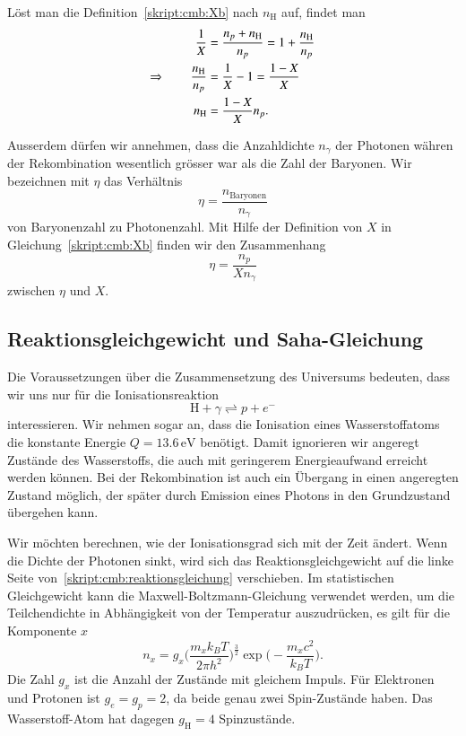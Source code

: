 Löst man die Definition~\eqref{skript:cmb:Xb} nach $n_\text{H}$ auf,
findet man
\begin{align}
\frac1X
&=
\frac{n_p+n_\text{H}}{n_p}
=
1+
\frac{n_\text{H}}{n_p}
\notag
\\
\Rightarrow
\qquad
\frac{n_\text{H}}{n_p}
&=
\frac{1}{X}-1
=
\frac{1-X}{X}
\notag
\\
n_\text{H}
&=
\frac{1-X}{X}n_p.
\label{skript:cmb:XnH}
\end{align}

Ausserdem dürfen wir annehmen, dass die Anzahldichte $n_\gamma$
der Photonen währen der Rekombination wesentlich grösser war als
die Zahl der Baryonen.
Wir bezeichnen mit $\eta$ das Verhältnis
\[
\eta = \frac{n_\text{Baryonen}}{n_\gamma}
\]
von Baryonenzahl zu Photonenzahl.
Mit Hilfe der Definition von $X$ in Gleichung~\eqref{skript:cmb:Xb}
finden wir den Zusammenhang
\begin{equation}
\eta = \frac{n_p}{Xn_\gamma}
\label{skript:cmb:etaX}
\end{equation}
zwischen $\eta$ und $X$.

\subsection{Reaktionsgleichgewicht und Saha-Gleichung}
Die Voraussetzungen über die Zusammensetzung des Universums bedeuten,
dass wir uns nur für die Ionisationsreaktion
\begin{equation}
\text{H} + \gamma 
\rightleftharpoons
p + e^-
\label{skript:cmb:reaktionsgleichung}
\end{equation}
interessieren.
Wir nehmen sogar an, dass die Ionisation eines Wasserstoffatoms 
die konstante Energie $Q=13.6\,\text{eV}$ benötigt.
Damit ignorieren wir angeregt Zustände des Wasserstoffs, die auch
mit geringerem Energieaufwand erreicht werden können.
Bei der Rekombination ist auch ein Übergang in einen angeregten
Zustand möglich, der später durch Emission eines Photons in den Grundzustand
übergehen kann.

Wir möchten berechnen, wie der Ionisationsgrad sich mit der Zeit ändert.
Wenn die Dichte der Photonen sinkt, wird sich das Reaktionsgleichgewicht
auf die linke Seite von~\eqref{skript:cmb:reaktionsgleichung} verschieben.
Im statistischen Gleichgewicht kann die Maxwell-Boltzmann-Gleichung
verwendet werden, um die Teilchendichte in Abhängigkeit von der Temperatur
auszudrücken, es gilt für die Komponente $x$
\[
n_x
=
g_x \biggl(\frac{m_xk_BT}{2\pi h^2}\biggr)^{\frac32}
\exp\biggl(-\frac{m_xc^2}{k_BT}\biggr).
\]
Die Zahl $g_x$ ist die Anzahl der Zustände mit gleichem Impuls.
Für Elektronen und Protonen ist $g_e=g_p=2$, da beide genau zwei
Spin-Zustände haben.
Das Wasserstoff-Atom hat dagegen $g_\text{H}=4$ Spinzustände.

